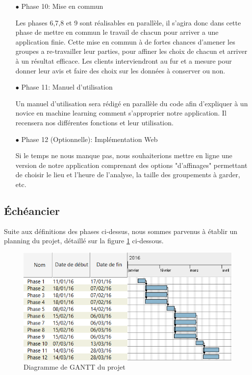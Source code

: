 \documentclass{article}
\begin{document}
\begin{itemize}
\item[$\bullet$] \color{red}Phase 10: Mise en commun

\color{black}
Les phases 6,7,8 et 9 sont réalisables en parallèle, il s'agira donc dans cette phase de mettre en commun le travail de chacun pour arriver a une application finie. 
Cette mise en commun à de fortes chances d'amener les groupes a re-travailler leur parties, pour affiner les choix de chacun et arriver à un résultat efficace. 
Les clients interviendront au fur et a mesure pour donner leur avis et faire des choix sur les données à conserver ou non.\\

\item[$\bullet$] \color{red}Phase 11: Manuel d'utilisation \color{black}

Un manuel d'utilisation sera rédigé en parallèle du code afin d'expliquer à un novice en machine learning comment s'approprier notre application. 
Il recensera nos différentes fonctions et leur utilisation.\\

\item[$\bullet$] \color{red}Phase 12 (Optionnelle): Implémentation Web \color{black}

Si le temps ne nous manque pas, nous souhaiterions mettre en ligne une version de notre application comprenant des options "d'affinages" permettant de choisir le lieu et l'heure de l'analyse, la taille des groupements à garder, etc.

\end{itemize}

\subsection{\'Echéancier}

Suite aux définitions des phases ci-dessus, nous sommes parvenus à établir un planning du projet, détaillé sur la figure \ref{fig:gantt} ci-dessous.

\begin{figure}[h]
\centering
\includegraphics[scale=0.7]{gantt}
\caption{Diagramme de GANTT du projet}
\label{fig:gantt}
\end{figure}
\end{document}
